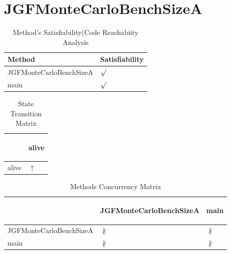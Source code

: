 \documentclass[10pt]{article}
\begin{document}
\section{{\color{Fuchsia}JGFMonteCarloBenchSizeA}}
\label{JGFMonteCarloBenchSizeA}
\begin{longtable}{|l|l|}
\caption{Method's Satisfiability(Code Reachabiity Analysis}\\
\hline
Method & Satisfiability\\
\hline
JGFMonteCarloBenchSizeA&{\color{blue}$\surd$}\\
\hline
main&{\color{blue}$\surd$}\\
\hline
\end{longtable}
\begin{longtable}{|l|l|}
\caption{State Transition Matrix}\\
\hline
&\begin{sideways}alive\end{sideways}\\
\hline
alive&{\color{blue}$\uparrow$}\\
\hline
\end{longtable}
\begin{longtable}{|l|l|l|}
\caption{Methods Concurrency Matrix}\\
\hline
&\begin{sideways}JGFMonteCarloBenchSizeA\end{sideways}&\begin{sideways}main\end{sideways}\\
\hline
JGFMonteCarloBenchSizeA&{\color{BrickRed}$\nparallel$}&{\color{BrickRed}$\nparallel$}\\
\hline
main&{\color{BrickRed}$\nparallel$}&{\color{BrickRed}$\nparallel$}\\
\hline
\end{longtable}
\newpage
\end{document}
